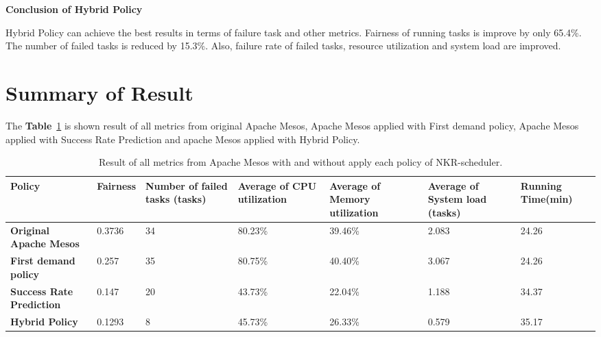 \documentclass[12pt,oneside,openright,a4paper]{cpe-english-project}
\begin{document}
\newpage
\textbf{Conclusion of Hybrid Policy}
\newline

\hspace{10mm}Hybrid Policy can achieve the best results in terms of failure task and other metrics. Fairness of running tasks is improve by only 65.4\%. The number of failed tasks is reduced by 15.3\%. Also, failure rate of failed tasks, resource utilization and system load are improved.

\section{Summary of Result}  

\hspace{10mm}The \textbf{Table}~\ref{tbl:chap4Sum} is shown result of all metrics from original Apache Mesos, Apache Mesos applied with First demand policy, Apache Mesos applied with Success Rate Prediction and apache Mesos applied with Hybrid Policy.

  \begin{table}[!h]
  \caption{Result of all metrics from Apache Mesos with and without apply each policy of NKR-scheduler.}\label{tbl:chap4Sum}
  \begin{tabular}{@{}|p{}|p{}|p{}|p{}|p{}|p{}|p{}|}
   \hline
   \textbf{Policy} & \textbf{Fairness} & \textbf{Number of failed tasks (tasks)} & \textbf{Average of CPU utilization} & \textbf{Average of Memory utilization} & \textbf{Average of System load (tasks)} & \textbf{Running Time(min)} \\
   \hline
   \textbf{Original Apache Mesos}& 0.3736 & 34& 80.23\% & 39.46\% &2.083& 24.26 \\
   \hline
   \textbf{First demand policy} & 0.257& 35& 80.75\% & 40.40\% & 3.067& 24.26\\
   \hline
   \textbf{Success Rate Prediction}& 0.147& 20& 43.73\% & 22.04\%& 1.188& 34.37 \\
   \hline
   \textbf{Hybrid Policy} & 0.1293 & 8 & 45.73\% & 26.33\% & 0.579  & 35.17 \\ 
   \hline                   
  \end{tabular}
\end{table}

\end{document}
